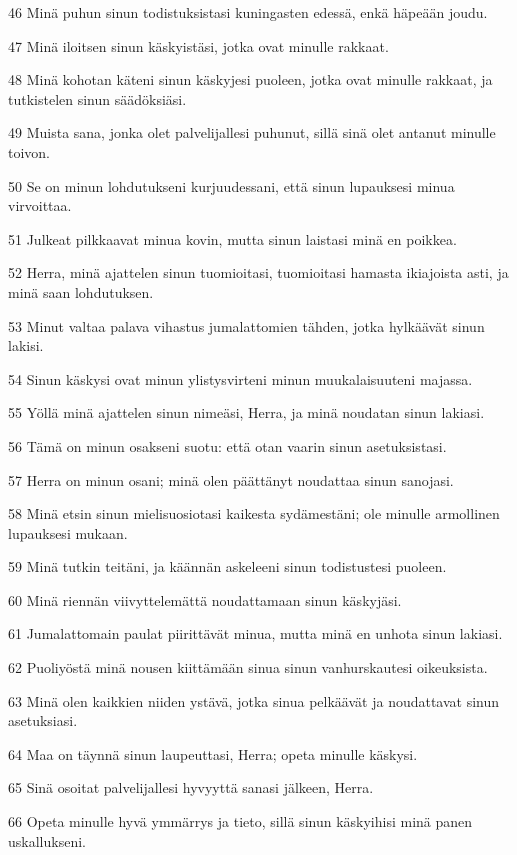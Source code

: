 \par 46 Minä puhun sinun todistuksistasi kuningasten edessä, enkä häpeään joudu.
\par 47 Minä iloitsen sinun käskyistäsi, jotka ovat minulle rakkaat.
\par 48 Minä kohotan käteni sinun käskyjesi puoleen, jotka ovat minulle rakkaat, ja tutkistelen sinun säädöksiäsi.
\par 49 Muista sana, jonka olet palvelijallesi puhunut, sillä sinä olet antanut minulle toivon.
\par 50 Se on minun lohdutukseni kurjuudessani, että sinun lupauksesi minua virvoittaa.
\par 51 Julkeat pilkkaavat minua kovin, mutta sinun laistasi minä en poikkea.
\par 52 Herra, minä ajattelen sinun tuomioitasi, tuomioitasi hamasta ikiajoista asti, ja minä saan lohdutuksen.
\par 53 Minut valtaa palava vihastus jumalattomien tähden, jotka hylkäävät sinun lakisi.
\par 54 Sinun käskysi ovat minun ylistysvirteni minun muukalaisuuteni majassa.
\par 55 Yöllä minä ajattelen sinun nimeäsi, Herra, ja minä noudatan sinun lakiasi.
\par 56 Tämä on minun osakseni suotu: että otan vaarin sinun asetuksistasi.
\par 57 Herra on minun osani; minä olen päättänyt noudattaa sinun sanojasi.
\par 58 Minä etsin sinun mielisuosiotasi kaikesta sydämestäni; ole minulle armollinen lupauksesi mukaan.
\par 59 Minä tutkin teitäni, ja käännän askeleeni sinun todistustesi puoleen.
\par 60 Minä riennän viivyttelemättä noudattamaan sinun käskyjäsi.
\par 61 Jumalattomain paulat piirittävät minua, mutta minä en unhota sinun lakiasi.
\par 62 Puoliyöstä minä nousen kiittämään sinua sinun vanhurskautesi oikeuksista.
\par 63 Minä olen kaikkien niiden ystävä, jotka sinua pelkäävät ja noudattavat sinun asetuksiasi.
\par 64 Maa on täynnä sinun laupeuttasi, Herra; opeta minulle käskysi.
\par 65 Sinä osoitat palvelijallesi hyvyyttä sanasi jälkeen, Herra.
\par 66 Opeta minulle hyvä ymmärrys ja tieto, sillä sinun käskyihisi minä panen uskallukseni.

